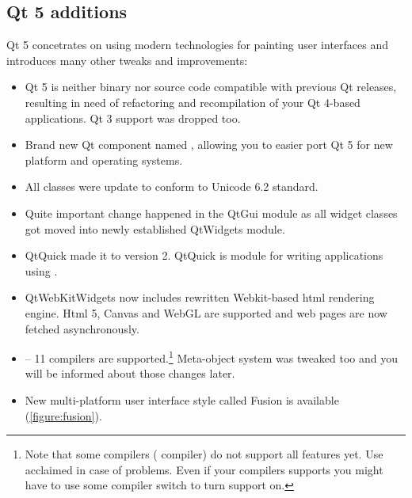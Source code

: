 \subsection{Qt 5 additions}
Qt 5 concetrates on using modern technologies for painting user interfaces and introduces many other tweaks and improvements:
\begin{itemize}
\item
Qt 5 is neither binary nor source code compatible with previous Qt releases, resulting in need of refactoring and recompilation of your Qt 4-based applications. Qt 3 support was dropped too.


\item
Brand new Qt component named , allowing you to easier port Qt 5 for new platform and operating systems.

\item
All classes were update to conform to Unicode 6.2 standard.

\item
Quite important change happened in the QtGui module as all widget classes got moved into newly established QtWidgets module.

\item
QtQuick made it to version 2. QtQuick is module for writing applications using .

\item
QtWebKitWidgets now includes rewritten Webkit-based html rendering engine. Html 5, Canvas and WebGL are supported and web pages are now fetched asynchronously.


\item
{} -- 11 compilers are supported.\footnote{Note that some compilers (\eg {} compiler) do not support all  features yet. Use acclaimed  in case of problems. Even if your compilers supports  you might have to use some compiler switch to turn  support on.} Meta-object system was tweaked too and you will be informed about those changes later.

\item
New multi-platform user interface style called Fusion is available (\autoref{figure:fusion}).
\end{itemize}


